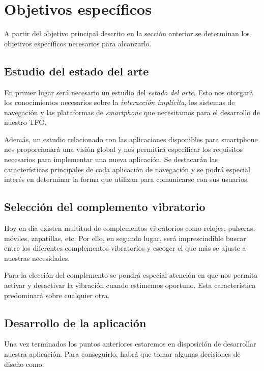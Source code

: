 \section{Objetivos específicos}

A partir del objetivo principal descrito en la sección anterior se determinan los objetivos
específicos necesarios para alcanzarlo.

\subsection{Estudio del estado del arte}

En primer lugar será necesario un estudio del \emph{estado del arte}. Esto nos otorgará los
conocimientos necesarios sobre la \emph{interacción implícita}, los sistemas de navegación y
las plataformas de \emph{smartphone} que necesitamos para el desarrollo de nuestro \acs{TFG}.

Además, un estudio relacionado con las aplicaciones disponibles para smartphone nos
proporcionará una visión global y nos permitirá especificar los requisitos necesarios para
implementar una nueva aplicación. Se destacarán las características principales de cada aplicación
de navegación y se podrá especial interés en determinar la forma que utilizan para comunicarse con
sus usuarios.

\subsection{Selección del complemento vibratorio}

Hoy en día existen multitud de complementos vibratorios como relojes, pulseras, móviles, zapatillas,
etc. Por ello, en segundo lugar, será imprescindible buscar entre los diferentes complementos
vibratorios y escoger el que más se ajuste a nuestras necesidades.

Para la elección del complemento se pondrá especial atención en que nos permita activar y desactivar
la vibración cuando estimemos oportuno. Esta característica predominará sobre cualquier otra.

\subsection{Desarrollo de la aplicación}

Una vez terminados los puntos anteriores estaremos en disposición de desarrollar nuestra aplicación.
Para conseguirlo, habrá que tomar algunas decisiones de diseño como:

